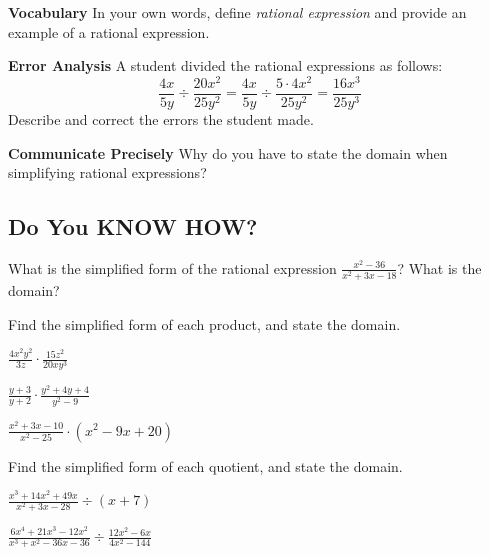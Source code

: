 \documentclass{article}
\newenvironment{practice}[2]{}{}
\begin{document}
\begin{practice}{2}{1}
\textbf{Vocabulary} In your own words, define \emph{rational expression} and provide an example of a rational expression.
\end{practice}

\begin{practice}{3}{1}
\textbf{Error Analysis} A student divided the rational expressions as follows:
$$ \frac{4x}{5y} \div \frac{20x^2}{25y^2} = \frac{4x}{5y} \div \frac{5 \cdot 4x^2}{25y^2} = \frac{16x^3}{25y^3} $$
Describe and correct the errors the student made.
\end{practice}

\begin{practice}{4}{1}
\textbf{Communicate Precisely} Why do you have to state the domain when simplifying rational expressions?
\end{practice}

\subsection*{Do You KNOW HOW?}

\begin{practice}{5}{1}
What is the simplified form of the rational expression $\frac{x^2 - 36}{x^2 + 3x - 18}$? What is the domain?
\end{practice}

Find the simplified form of each product, and state the domain.

\begin{practice}{6}{1}
$\frac{4x^2y^2}{3z} \cdot \frac{15z^2}{20xy^3}$
\end{practice}

\begin{practice}{7}{1}
$\frac{y + 3}{y + 2} \cdot \frac{y^2 + 4y + 4}{y^2 - 9}$
\end{practice}

\begin{practice}{8}{1}
$\frac{x^2 + 3x - 10}{x^2 - 25} \cdot (x^2 - 9x + 20)$
\end{practice}

Find the simplified form of each quotient, and state the domain.

\begin{practice}{9}{1}
$\frac{x^3 + 14x^2 + 49x}{x^2 + 3x - 28} \div (x + 7)$
\end{practice}

\begin{practice}{10}{1}
$\frac{6x^4 + 21x^3 - 12x^2}{x^3 + x^2 - 36x - 36} \div \frac{12x^2 - 6x}{4x^2 - 144}$
\end{practice}
\end{document}
